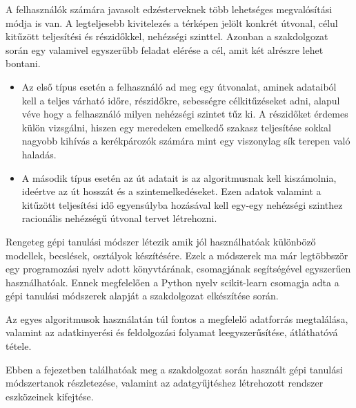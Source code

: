 



A felhasználók számára javasolt edzésterveknek több lehetséges megvalósítási módja is van. A legteljesebb kivitelezés a térképen jelölt konkrét útvonal, célul kitűzött teljesítési és részidőkkel, nehézségi szinttel. Azonban a szakdolgozat során egy valamivel egyszerűbb feladat elérése a cél, amit két alrészre lehet bontani.
\begin{itemize}
	\item Az első típus esetén a felhasználó ad meg egy útvonalat, aminek adataiból kell a teljes várható időre, részidőkre, sebességre célkitűzéseket adni, alapul véve hogy a felhasználó milyen nehézségi szintet tűz ki. A részidőket érdemes külön vizsgálni, hiszen egy meredeken emelkedő szakasz teljesítése sokkal nagyobb kihívás a kerékpározók számára mint egy viszonylag sík terepen való haladás.
	\item A második típus esetén az út adatait is az algoritmusnak kell kiszámolnia, ideértve az út hosszát és a szintemelkedéseket. Ezen adatok valamint a kitűzött teljesítési idő egyensúlyba hozásával kell egy-egy nehézségi szinthez racionális nehézségű útvonal tervet létrehozni.
\end{itemize}


Rengeteg gépi tanulási módszer létezik amik jól használhatóak különböző modellek, becslések, osztályok készítésére. Ezek a módszerek ma már legtöbbször egy programozási nyelv adott könyvtárának, csomagjának segítségével egyszerűen használhatóak. Ennek megfelelően a Python nyelv scikit-learn \cite{scikitlearn} csomagja adta a gépi tanulási módszerek alapját a szakdolgozat elkészítése során.

Az egyes algoritmusok használatán túl fontos a megfelelő adatforrás megtalálása, valamint az adatkinyerési és feldolgozási folyamat leegyszerűsítése, átláthatóvá tétele. 

Ebben a fejezetben találhatóak meg a szakdolgozat során használt gépi tanulási módszertanok részletezése, valamint az adatgyűjtéshez létrehozott rendszer eszközeinek kifejtése.



